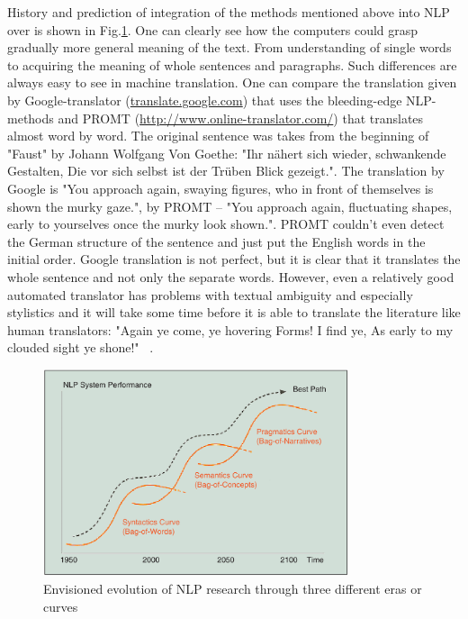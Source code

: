 \documentclass[11pt]{report}
\numberwithin{equation}{section} %
\begin{document}
History and prediction of integration of the methods mentioned above into NLP over is shown in Fig.\ref{fig:NLPLevels}. One can clearly see how the computers could grasp gradually more general meaning of the text. From understanding of single words to acquiring the meaning of whole sentences and paragraphs. Such differences are always easy to see in machine translation. One can compare the translation given by Google-translator (\url{translate.google.com}) that uses the bleeding-edge NLP-methods and PROMT (\url{http://www.online-translator.com/}) that translates almost word by word. The original sentence was takes from the beginning of "Faust" by Johann Wolfgang Von Goethe: "Ihr n{\"a}hert sich wieder, schwankende Gestalten, Die vor sich selbst ist der Tr{\"u}ben Blick gezeigt.". The translation by Google is "You approach again, swaying figures, who in front of themselves is shown the murky gaze.", by PROMT -- "You approach again, fluctuating shapes, early to yourselves once the murky look shown.". PROMT couldn't even detect the German structure of the sentence and just put the English words in the initial order. Google translation is not perfect, but it is clear that it translates the whole sentence and not only the separate words. However, even a relatively good automated translator has problems with textual ambiguity and especially stylistics and it will take some time before it is able to translate the literature like human translators: "Again ye come, ye hovering Forms! I find ye, As early to my clouded sight ye shone!" ~\cite{Faust}.\\ 

\begin{figure}[h!]
  \centering
  \includegraphics[width=0.8\textwidth]{img/NLPLevels}
    \caption{ Envisioned evolution of NLP research through three different eras or curves ~\cite{Cambria} }\label{fig:NLPLevels}
\end{figure}
\end{document}
